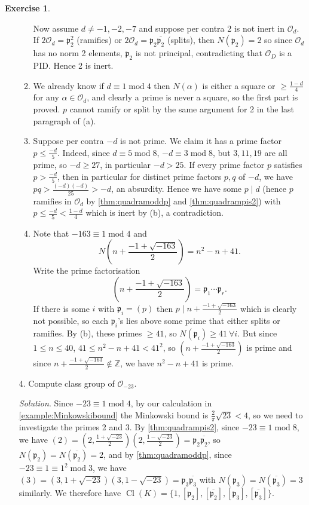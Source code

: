 \documentclass{article}
\newcommand{\Z}{\mathbb{Z}}
\newcommand{\Mod}{\operatorname{mod}}
\newcommand{\Cl}{\operatorname{Cl}}
\newcommand{\ri}{\mathcal{O}}
\newcommand{\ip}{\mathfrak{p}}
\theoremstyle{definition}
\newtheorem{exe}[defn]{Exercise}
\begin{document}
\begin{exe}
\begin{enumerate}
\begin{enumerate}
Now assume $d\neq -1,-2,-7$ and suppose per contra 2 is not inert in $\ri_d$. If $2\ri_d=\ip_2^2$ (ramifies) or $2\ri_d=\ip_2\overline{\ip_2}$ (splits), then $N(\ip_2)=2$ so since $\ri_d$ has no norm 2 elements, $\ip_2$ is not principal, contradicting that $\ri_D$ is a PID. Hence 2 is inert.
\item We already know if $d\equiv 1\Mod 4$ then $N(\alpha)$ is either a square or $\geq\frac{1-d}{4}$ for any $\alpha\in\ri_d$, and clearly a prime is never a square, so the first part is proved. $p$ cannot ramify or split by the same argument for 2 in the last paragraph of (a).
\item Suppose per contra $-d$ is not prime. We claim it has a prime factor $p\leq\frac{-d}{5}$. Indeed, since $d\equiv 5\Mod 8$, $-d\equiv 3\Mod 8$, but $3,11,19$ are all prime, so $-d\geq 27$, in particular $-d>25$. If every prime factor $p$ satisfies $p>\frac{-d}{5}$, then in particular for distinct prime factors $p,q$ of $-d$, we have $pq>\frac{(-d)(-d)}{25}>-d$, an absurdity. Hence we have some $p\mid d$ (hence $p$ ramifies in $\ri_d$ by \ref{thm:quadramoddp} and \ref{thm:quadrampis2}) with $p\leq\frac{-d}{5}<\frac{1-d}{4}$ which is inert by (b), a contradiction.
\item Note that $-163\equiv 1\Mod 4$ and
\[
N\left(n+\frac{-1+\sqrt{-163}}{2}\right)=n^2-n+41.
\]
Write the prime factorisation
\[
\left(n+\frac{-1+\sqrt{-163}}{2}\right)=\ip_1\cdots\ip_r.
\]
If there is some $i$ with $\ip_i=(p)$ then $p\mid n+\frac{-1+\sqrt{-163}}{2}$ which is clearly not possible, so each $\ip_i$'s lies above some prime that either splits or ramifies. By (b), these primes $\geq 41$, so $N(\ip_i)\geq 41 \ \forall i$. But since $1\leq n\leq 40$, $41\leq n^2-n+41<41^2$, so $\left(n+\frac{-1+\sqrt{-163}}{2}\right)$ is prime and since $n+\frac{-1+\sqrt{-163}}{2}\notin\Z$, we have $n^2-n+41$ is prime.
\end{enumerate}

\item[4.] Compute class group of $\ri_{-23}$.

\textit{Solution}. Since $-23\equiv 1\Mod 4$, by our calculation in \ref{example:Minkowskibound} the Minkowski bound is $\frac{2}{\pi}\sqrt{23}<4$, so we need to investigate the primes 2 and 3. By \ref{thm:quadrampis2}, since $-23\equiv 1\Mod 8$, we have $(2)=\left(2,\frac{1+\sqrt{-23}}{2}\right)\left(2,\frac{1-\sqrt{-23}}{2}\right)=\ip_2\overline{\ip_2}$, so $N(\ip_2)=N(\overline{\ip_2})=2$, and by \ref{thm:quadramoddp}, since $-23\equiv 1\equiv 1^2\Mod 3$, we have $(3)=\left(3,1+\sqrt{-23}\right)\left(3,1-\sqrt{-23}\right)=\ip_3\overline{\ip_3}$ with $N(\ip_3)=N(\overline{\ip_3})=3$ similarly. We therefore have $\Cl(K)=\{1,[\ip_2],[\overline{\ip_2}],[\ip_3],[\overline{\ip_3}]\}$.


\end{enumerate}
\end{exe}
\end{document}
